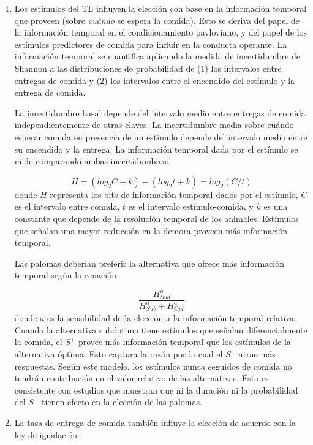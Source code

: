 \documentclass[a4paper,12pt]{article}
\begin{document}
\begin{enumerate}
	\item Los estímulos del TL influyen la elección con base en la información temporal que proveen (sobre {\itshape cuándo} se espera la comida). Esto se deriva del papel de la información temporal en el condicionamiento pavloviano, y del papel de los estímulos predictores de comida para influir en la conducta operante. La información temporal se cuantifica aplicando la medida de incertidumbre de Shannon a las distribuciones de probabilidad de (1) los intervalos entre entregas de comida y (2) los intervalos entre el encendido del estímulo y la entrega de comida.

		La incertidumbre basal depende del intervalo medio entre entregas de comida independientemente de otras claves. La incertidumbre media sobre cuándo esperar comida en presencia de un estímulo depende del intervalo medio entre su encendido y la entrega. La información temporal dada por el estímulo se mide comparando ambas incertidumbres:

		\begin{equation}
			H = 
			(log_{2}C+k)
			-
			(log_{2}t+k)
			=
			log_{2}(C/t)
		\end{equation}
		donde $H$ representa los bits de información temporal dados por el estímulo, $C$ es el intervalo entre comida, $t$ es el intervalo estímulo-comida, y $k$ es una constante que depende de la resolución temporal de los animales. Estímulos que señalan una mayor reducción en la demora proveen más información temporal.

		Las palomas deberían preferir la alternativa que ofrece más información temporal según la ecuación 

		\begin{equation}
			\frac{
				H^{a}_{Sub}
			}{
				H^{a}_{Sub} + H^{a}_{Opt}
			}
		\end{equation}
		donde $a$ es la sensibilidad de la elección a la información temporal relativa. Cuando la alternativa subóptima tiene estímulos que señalan diferencialmente la comida, el $S^{+}$ provee más información temporal que los estímulos de la alternativa óptima. Esto captura la razón por la cual el $S^{+}$ atrae más respuestas. Según este modelo, los estímulos nunca seguidos de comida no tendrán contribución en el valor relativo de las alternativas. Esto es consistente con estudios que muestran que ni la duración ni la probabilidad del $S^{-}$ tienen efecto en la elección de las palomas.
	\item La tasa de entrega de comida también influye la elección de acuerdo con la ley de igualación:


\end{enumerate}
\end{document}

